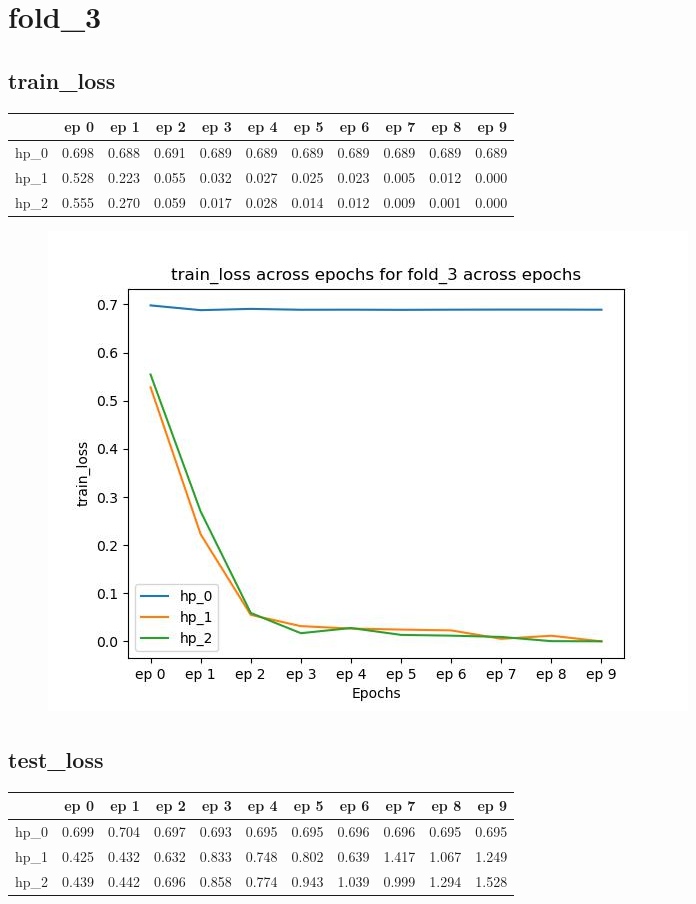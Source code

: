 \documentclass{article}
\begin{document}
\section{fold\_3}
\subsection{train\_loss}
\begin{tabular}{lrrrrrrrrrr}
\toprule
{} &   ep 0 &   ep 1 &   ep 2 &   ep 3 &   ep 4 &   ep 5 &   ep 6 &   ep 7 &   ep 8 &   ep 9 \\
\midrule
hp\_0 &  0.698 &  0.688 &  0.691 &  0.689 &  0.689 &  0.689 &  0.689 &  0.689 &  0.689 &  0.689 \\
hp\_1 &  0.528 &  0.223 &  0.055 &  0.032 &  0.027 &  0.025 &  0.023 &  0.005 &  0.012 &  0.000 \\
hp\_2 &  0.555 &  0.270 &  0.059 &  0.017 &  0.028 &  0.014 &  0.012 &  0.009 &  0.001 &  0.000 \\
\bottomrule
\end{tabular}

\begin{figure}[H]
\includegraphics[scale = 0.75]{fold_3/train_loss}
\end{figure}
\subsection{test\_loss}
\begin{tabular}{lrrrrrrrrrr}
\toprule
{} &   ep 0 &   ep 1 &   ep 2 &   ep 3 &   ep 4 &   ep 5 &   ep 6 &   ep 7 &   ep 8 &   ep 9 \\
\midrule
hp\_0 &  0.699 &  0.704 &  0.697 &  0.693 &  0.695 &  0.695 &  0.696 &  0.696 &  0.695 &  0.695 \\
hp\_1 &  0.425 &  0.432 &  0.632 &  0.833 &  0.748 &  0.802 &  0.639 &  1.417 &  1.067 &  1.249 \\
hp\_2 &  0.439 &  0.442 &  0.696 &  0.858 &  0.774 &  0.943 &  1.039 &  0.999 &  1.294 &  1.528 \\
\bottomrule
\end{tabular}
\end{document}
